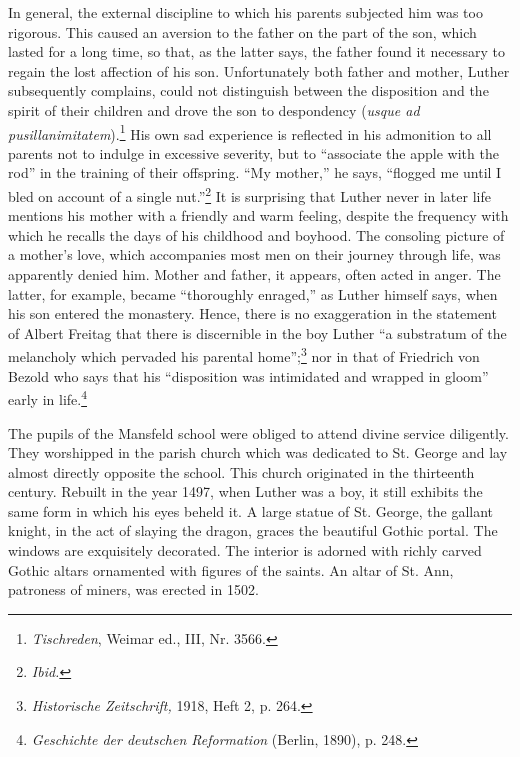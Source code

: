 In general, the external discipline to which his parents subjected
him was too rigorous. This caused an aversion to the father on the
part of the son, which lasted for a long time, so that, as the latter
says, the father found it necessary to regain the lost affection of
his son. Unfortunately both father and mother, Luther subsequently
complains, could not distinguish between the disposition and the
spirit of their children and drove the son to despondency (\textit{usque ad
pusillanimitatem}).\footnote
{\textit{Tischreden}, Weimar ed., III, Nr. 3566.}
His own sad experience is reflected in his
admonition to all parents not to indulge in excessive severity,
but to “associate the apple with the rod” in the training of their
offspring. “My mother,” he says, “flogged me until I bled on account of a single nut.”\footnote{\textit{Ibid.}}
It is surprising that Luther never in
later life mentions his mother with a friendly and warm feeling,
despite the frequency with which he recalls the days of his childhood and boyhood.
The consoling picture of a mother’s love, which
accompanies most men on their journey through life, was apparently
denied him. Mother and father, it appears, often acted in anger.
The latter, for example, became “thoroughly enraged,” as Luther
himself says, when his son entered the monastery. Hence, there
is no exaggeration in the statement of Albert Freitag that there is
discernible in the boy Luther “a substratum of the melancholy which
pervaded his parental home”;\footnote{\textit{Historische Zeitschrift,} 1918, Heft 2, p. 264.}
nor in that of Friedrich von Bezold
who says that his “disposition was intimidated and wrapped in gloom”
early in life.\footnote{\textit{Geschichte der deutschen Reformation} (Berlin, 1890), p. 248.}

The pupils of the Mansfeld school were obliged to attend divine
service diligently. They worshipped in the parish church which
was dedicated to St. George and lay almost directly opposite
the school. This church originated in the thirteenth century. Rebuilt in the year 1497, when Luther was a boy, it still exhibits
the same form in which his eyes beheld it. A large statue of St.
George, the gallant knight, in the act of slaying the dragon, graces
the beautiful Gothic portal. The windows are exquisitely decorated.
The interior is adorned with richly carved Gothic altars ornamented
with figures of the saints. An altar of St. Ann, patroness of miners, was
erected in 1502.

